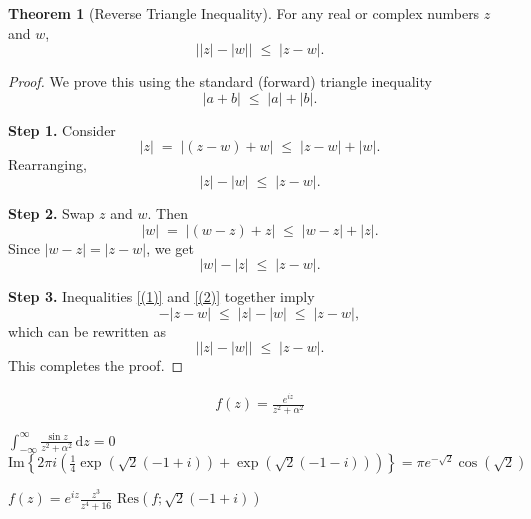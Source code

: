 \documentclass[12pt]{article}
\theoremstyle{definition} %
\newtheorem{theorem}{Theorem}
\theoremstyle{plain} %
\begin{document}
\begin{theorem}[Reverse Triangle Inequality]
    \label{thm:reverse_triangle_inequality}
    For any real or complex numbers $z$ and $w$, 
    \[
    \bigl| \lvert z\rvert - \lvert w\rvert \bigr| 
    \;\le\; 
    \lvert z - w\rvert.
    \]
    \end{theorem}
    
    \begin{proof}
    We prove this using the standard (forward) triangle inequality 
    \[
    \lvert a + b\rvert \;\le\; \lvert a\rvert + \lvert b\rvert.
    \]
    
    \noindent
    \textbf{Step 1.} Consider 
    \[
    \lvert z\rvert 
    \;=\; 
    \bigl\lvert (z - w) + w\bigr\rvert
    \;\le\; 
    \lvert z - w\rvert + \lvert w\rvert.
    \]
    Rearranging, 
    \[
    \lvert z\rvert - \lvert w\rvert 
    \;\le\; 
    \lvert z - w\rvert.
    \tag{1}
    \]
    
    \noindent
    \textbf{Step 2.} Swap $z$ and $w$. Then
    \[
    \lvert w\rvert 
    \;=\; 
    \bigl\lvert (w - z) + z\bigr\rvert
    \;\le\;
    \lvert w - z\rvert + \lvert z\rvert.
    \]
    Since $\lvert w - z\rvert = \lvert z - w\rvert$, we get
    \[
    \lvert w\rvert - \lvert z\rvert 
    \;\le\; 
    \lvert z - w\rvert.
    \tag{2}
    \]
    
    \noindent
    \textbf{Step 3.} Inequalities \eqref{(1)} and \eqref{(2)} together imply
    \[
    -\lvert z - w\rvert 
    \;\le\;
    \lvert z\rvert - \lvert w\rvert 
    \;\le\;
    \lvert z - w\rvert,
    \]
    which can be rewritten as
    \[
    \bigl|\lvert z\rvert - \lvert w\rvert\bigr|
    \;\le\;
    \lvert z - w\rvert.
    \]
    This completes the proof.
    \end{proof}
    \begin{align}
        f(z)=\frac{e^{iz}}{z^{2}+\alpha^{2}}
    \end{align}

    $\int_{-\infty}^{\infty } \frac{\sin z}{z^{2}+\alpha^{2}} \,\mathrm{d}z =0$  
    $\text{Im}\left\{ 2\pi i \left( \frac{1}{4}\exp\left( \sqrt{2} (-1+i) \right) + \exp\left( \sqrt{2} (-1-i)  \right) \right) \right\} = \pi e^{-\sqrt{2} }\cos(\sqrt{2}) $ 

    $f(z)=e^{iz}\frac{z^{3}}{z^{4}+16}$
    $\text{Res} (f; \sqrt{2} (-1+i))$ 
    
\end{document}
